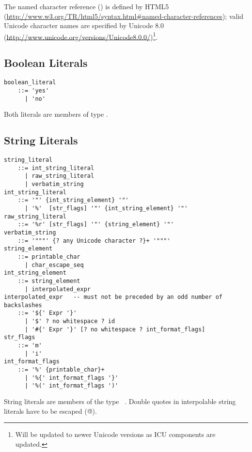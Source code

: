 The named character reference () is defined by HTML5 (\url{http://www.w3.org/TR/html5/syntax.html#named-character-references}); valid Unicode character names are specified by Unicode 8.0 (\url{http://www.unicode.org/versions/Unicode8.0.0/})\footnote{Will be updated to newer Unicode versions as ICU components are updated.}. 





\subsection{Boolean Literals}
\label{sec:booleanliterals}

\syntax\begin{lstlisting}
boolean_literal 
    ::= 'yes' 
      | 'no'
\end{lstlisting}

Both literals are members of type \lstinline@Boolean@. 





\subsection{String Literals}
\label{sec:stringliterals}

\syntax\begin{lstlisting}[mathescape=false,deletekeywords={no}]
string_literal 
    ::= int_string_literal
      | raw_string_literal
      | verbatim_string
int_string_literal 
    ::= '"' {int_string_element} '"'
      | '%'  [str_flags] '"' {int_string_element} '"'
raw_string_literal 
    ::= '%r' [str_flags] '"' {string_element} '"'
verbatim_string
    ::= '"""' {? any Unicode character ?}+ '"""'
string_element
    ::= printable_char 
      | char_escape_seq
int_string_element 
    ::= string_element 
      | interpolated_expr
interpolated_expr   -- must not be preceded by an odd number of backslashes
    ::= '${' Expr '}'
      | '$' ? no whitespace ? id
      | '#{' Expr '}' [? no whitespace ? int_format_flags]
str_flags 
    ::= 'm' 
      | 'i'
int_format_flags
    ::= '%' {printable_char}+
      | '%{' int_format_flags '}' 
      | '%(' int_format_flags ')' 
\end{lstlisting}

String literals are members of the type ~\lstinline@String@. Double quotes in interpolable string literals have to be escaped (\lstinline@\"@).

